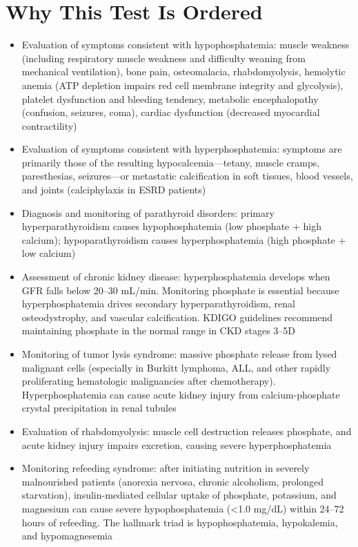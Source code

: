 \section*{Why This Test Is Ordered}
\begin{itemize}
  \item Evaluation of symptoms consistent with hypophosphatemia: muscle weakness (including respiratory muscle weakness and difficulty weaning from mechanical ventilation), bone pain, osteomalacia, rhabdomyolysis, hemolytic anemia (ATP depletion impairs red cell membrane integrity and glycolysis), platelet dysfunction and bleeding tendency, metabolic encephalopathy (confusion, seizures, coma), cardiac dysfunction (decreased myocardial contractility)
  \item Evaluation of symptoms consistent with hyperphosphatemia: symptoms are primarily those of the resulting hypocalcemia---tetany, muscle cramps, paresthesias, seizures---or metastatic calcification in soft tissues, blood vessels, and joints (calciphylaxis in ESRD patients)
  \item Diagnosis and monitoring of parathyroid disorders: primary hyperparathyroidism causes hypophosphatemia (low phosphate + high calcium); hypoparathyroidism causes hyperphosphatemia (high phosphate + low calcium)
  \item Assessment of chronic kidney disease: hyperphosphatemia develops when GFR falls below 20--30 mL/min. Monitoring phosphate is essential because hyperphosphatemia drives secondary hyperparathyroidism, renal osteodystrophy, and vascular calcification. KDIGO guidelines recommend maintaining phosphate in the normal range in CKD stages 3--5D
  \item Monitoring of tumor lysis syndrome: massive phosphate release from lysed malignant cells (especially in Burkitt lymphoma, ALL, and other rapidly proliferating hematologic malignancies after chemotherapy). Hyperphosphatemia can cause acute kidney injury from calcium-phosphate crystal precipitation in renal tubules
  \item Evaluation of rhabdomyolysis: muscle cell destruction releases phosphate, and acute kidney injury impairs excretion, causing severe hyperphosphatemia
  \item Monitoring refeeding syndrome: after initiating nutrition in severely malnourished patients (anorexia nervosa, chronic alcoholism, prolonged starvation), insulin-mediated cellular uptake of phosphate, potassium, and magnesium can cause severe hypophosphatemia (<1.0 mg/dL) within 24--72 hours of refeeding. The hallmark triad is hypophosphatemia, hypokalemia, and hypomagnesemia

\end{itemize}
